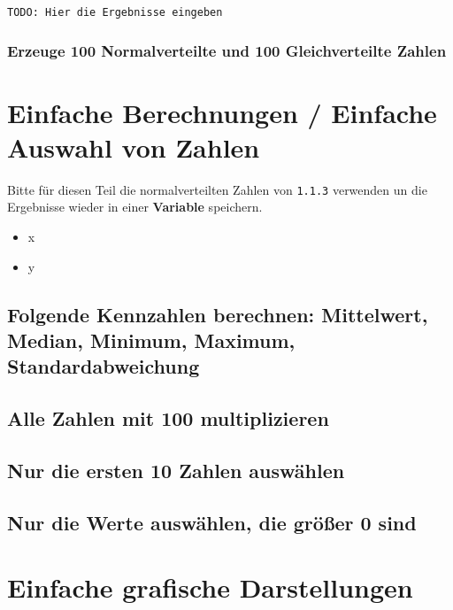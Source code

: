 \documentclass{article}
\begin{document}
 \begin{verbatim}
TODO: Hier die Ergebnisse eingeben
 \end{verbatim}
 
 \subsubsection{Erzeuge 100 Normalverteilte und 100 Gleichverteilte Zahlen}
 





\section{Einfache Berechnungen / Einfache Auswahl von Zahlen}

Bitte für diesen Teil die normalverteilten Zahlen von \texttt{1.1.3} verwenden un die Ergebnisse wieder in einer \textbf{Variable} speichern.

\begin{itemize}
	\item x
	\item y
\end{itemize}

\subsection{Folgende Kennzahlen berechnen: Mittelwert, Median, Minimum, Maximum, Standardabweichung}

\subsection{Alle Zahlen mit 100 multiplizieren}

\subsection{Nur die ersten 10 Zahlen auswählen}

\subsection{Nur die Werte auswählen, die größer 0 sind}


\section{Einfache grafische Darstellungen}
\end{document}
